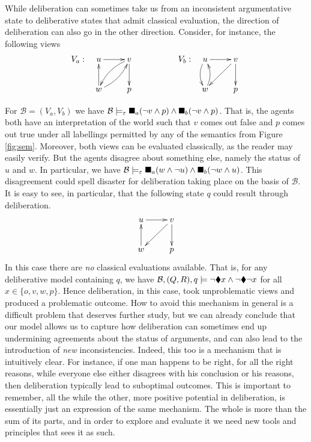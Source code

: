 \documentclass[greybox]{svmult}
\newcommand{\views}{\mathcal B}
\newcommand{\sem}{\varepsilon}
\begin{document}
\begin{example}\label{ex:ad}
While deliberation can sometimes take us from an inconsistent argumentative state to deliberative states that admit classical evaluation, the direction of deliberation can also go in the other direction. Consider, for instance, the following views
$$
\begin{array}{llll}
V_a: & \xymatrix{ u \ar[r] & v \ar@/_/[dl] \ar[d] \\ w \ar@/_/[ur] \ar[u] & p } &\hspace{1.5cm} V_b: & \xymatrix{u \ar@/_/[d] \ar[r] & v \ar[d] \ar[dl] \\ w \ar@/_/[u] & p }
\end{array}
$$

For $\views = (V_a,V_ b)$ we have $\views \models_\sem \cbox_a (\neg v \land p) \land \cbox_b (\neg v \land p)$. That is, the agents both have an interpretation of the world such that $v$ comes out false and $p$ comes out true under all labellings permitted by any of the semantics from Figure \ref{fig:sem}. Moreover, both views can be evaluated classically, as the reader may easily verify. But the agents disagree about something else, namely the status of $u$ and $w$. In particular, we have $\views \models_\sem \cbox_a (w \land \neg u) \land \cbox_b (\neg w \land u)$. This disagreement could spell disaster for deliberation taking place on the basis of $\views$. It is easy to see, in particular, that the following state $q$ could result through deliberation.
$$
\xymatrix{  u \ar[r] & v \ar[d] \ar[dl] \\ w \ar[u] & p }
$$
In this case there are \emph{no} classical evaluations available. That is, for any deliberative model containing $q$, we have $\views, (Q,R), q \models \neg \cdia x \land \neg \cdia \neg x$ for all $x \in \{o,v,w,p\}$. Hence deliberation, in this case, took unproblematic views and produced a problematic outcome. How to avoid this mechanism in general is a difficult problem that deserves further study, but we can already conclude that our model allows us to capture how deliberation can sometimes end up undermining agreements about the status of arguments, and can also lead to the introduction of \emph{new} inconsistencies. Indeed, this too is a mechanism that is intuitively clear. For instance, if one man happens to be right, for all the right reasons, while everyone else either disagrees with his conclusion or his reasons, then deliberation typically lead to suboptimal outcomes. This is important to remember, all the while the other, more positive potential in deliberation, is essentially just an expression of the same mechanism. The whole is more than the sum of its parts, and in order to explore and evaluate it we need new tools and principles that sees it as such.
\end{example}
\end{document}
